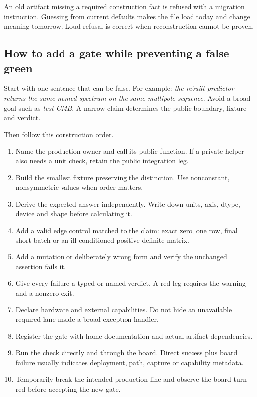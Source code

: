 An old artifact missing a required construction fact is refused with a
migration instruction.  Guessing from current defaults makes the file load
today and change meaning tomorrow.  Loud refusal is correct when
reconstruction cannot be proven.

\subsection{How to add a gate while preventing a false green}

Start with one sentence that can be false.  For example:
\emph{the rebuilt predictor returns the same named spectrum on the same
multipole sequence}.  Avoid a broad goal such as \emph{test CMB}.  A narrow
claim determines the public boundary, fixture and verdict.

Then follow this construction order.
\begin{enumerate}
  \item Name the production owner and call its public function.  If a private
        helper also needs a unit check, retain the public integration leg.
  \item Build the smallest fixture preserving the distinction.  Use
        nonconstant, nonsymmetric values when order matters.
  \item Derive the expected answer independently.  Write down units, axis,
        dtype, device and shape before calculating it.
  \item Add a valid edge control matched to the claim: exact zero, one row,
        final short batch or an ill-conditioned positive-definite matrix.
  \item Add a mutation or deliberately wrong form and verify the unchanged
        assertion fails it.
  \item Give every failure a typed or named verdict.  A red leg requires the
        warning and a nonzero exit.
  \item Declare hardware and external capabilities.  Do not hide an
        unavailable required lane inside a broad exception handler.
  \item Register the gate with home documentation and actual artifact
        dependencies.
  \item Run the check directly and through the board.  Direct success plus
        board failure usually indicates deployment, path, capture or
        capability metadata.
  \item Temporarily break the intended production line and observe the board
        turn red before accepting the new gate.
\end{enumerate}

